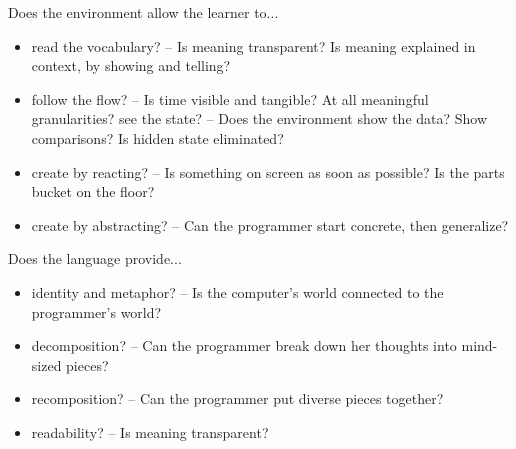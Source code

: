 Does the environment allow the learner to...
\begin{itemize}
\item read the vocabulary? -- Is meaning transparent? Is meaning explained in context, by showing and telling?
\item follow the flow? -- Is time visible and tangible? At all meaningful granularities?
see the state? -- Does the environment show the data? Show comparisons? Is hidden state eliminated?
\item create by reacting? -- Is something on screen as soon as possible? Is the parts bucket on the floor?
\item create by abstracting? -- Can the programmer start concrete, then generalize?
\end{itemize}
Does the language provide...
\begin{itemize}
\item identity and metaphor? -- Is the computer's world connected to the programmer's world?
\item decomposition? -- Can the programmer break down her thoughts into mind-sized pieces?
\item recomposition? -- Can the programmer put diverse pieces together?
\item readability? -- Is meaning transparent?
\end{itemize}